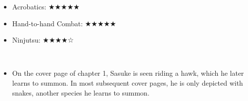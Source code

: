 \documentclass[a4paper,12pt]{article}
\begin{document}
\begin{itemize}
\item Acrobatics: ★★★★★
\item Hand-to-hand Combat: ★★★★★
\item Ninjutsu: ★★★★☆
\end{itemize}\\ \par \vspace{0.5cm}

\begin{itemize}
\item On the cover page of chapter 1, Sasuke is seen riding a hawk, which he later learns to summon. In most subsequent cover pages, he is only depicted with snakes, another species he learns to summon.
\end{itemize}\\ \par \vspace{0.5cm}
\end{document}
